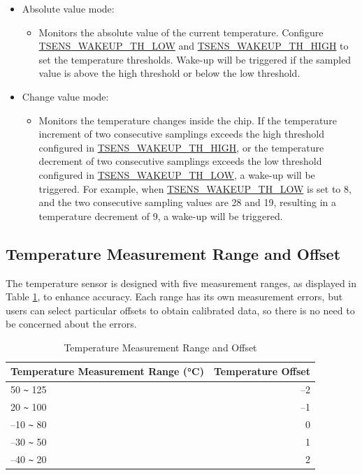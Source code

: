 \documentclass[main\_\_EN.tex]{subfiles}
\begin{document}
   \begin{itemize}
       \item Absolute value mode:
           \begin{itemize}
                \item Monitors the absolute value of the current temperature. Configure \hyperref[fielddesc:TSENSWAKEUPTHLOW]{TSENS\_WAKEUP\_TH\_LOW} and \hyperref[fielddesc:TSENSWAKEUPTHHIGH]{TSENS\_WAKEUP\_TH\_HIGH} to set the temperature thresholds. Wake-up will be triggered if the sampled value is above the high threshold or below the low threshold.
           \end{itemize}
       \item Change value mode:
            \begin{itemize}
                \item Monitors the temperature changes inside the chip. If the temperature increment of two consecutive samplings exceeds the high threshold configured in \hyperref[fielddesc:TSENSWAKEUPTHHIGH]{TSENS\_WAKEUP\_TH\_HIGH}, or the temperature decrement of two consecutive samplings exceeds the low threshold configured in \hyperref[fielddesc:TSENSWAKEUPTHLOW]{TSENS\_WAKEUP\_TH\_LOW}, a wake-up will be triggered. For example, when \hyperref[fielddesc:TSENSWAKEUPTHLOW]{TSENS\_WAKEUP\_TH\_LOW} is set to 8, and the two consecutive sampling values are 28 and 19, resulting in a temperature decrement of 9, a wake-up will be triggered.
            \end{itemize}
    \end{itemize}

\subsection{Temperature Measurement Range and Offset}

The temperature sensor is designed with five measurement ranges, as displayed in Table \ref{tab:tsensor-dac}, to enhance accuracy. Each range has its own measurement errors, but users can select particular offsets to obtain calibrated data, so there is no need to be concerned about the errors.

\begin{longtable}[c]{|l|r|}
    \caption{Temperature Measurement Range and Offset}
    \label{tab:tsensor-dac}
    \\\hline
    \rowcolor{lightgray}
    \textbf{Temperature Measurement Range (°C)}   & \textbf{Temperature Offset} \\\hline
    50 \verb+~+ 125 &  –2 \\\hline
    20 \verb+~+ 100 &  –1 \\\hline
    –10 \verb+~+ 80 &  0 \\\hline
    –30 \verb+~+ 50 &  1 \\\hline
    –40 \verb+~+ 20 &  2 \\\hline
\end{longtable}
\end{document}
